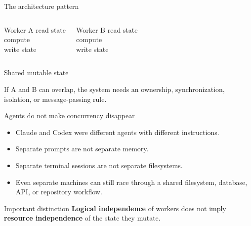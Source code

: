\documentclass{beamer}
\begin{document}
\begin{frame}{The architecture pattern}
\begin{columns}[T]
\begin{block}{Worker A}
read state\\
compute\\
write state
\end{block}

\begin{block}{Worker B}
read state\\
compute\\
write state
\end{block}
\end{columns}

\vspace{1em}
\centering
\Large Shared mutable state

\vspace{0.6em}
\normalsize
If A and B can overlap, the system needs an ownership, synchronization, isolation, or message-passing rule.
\end{frame}

\begin{frame}{Agents do not make concurrency disappear}
\begin{itemize}
  \item Claude and Codex were different agents with different instructions.
  \item Separate prompts are not separate memory.
  \item Separate terminal sessions are not separate filesystems.
  \item Even separate machines can still race through a shared filesystem, database, API, or repository workflow.
\end{itemize}

\vspace{0.8em}
\begin{block}{Important distinction}
\textbf{Logical independence} of workers does not imply \textbf{resource independence} of the state they mutate.
\end{block}
\end{frame}
\end{document}
